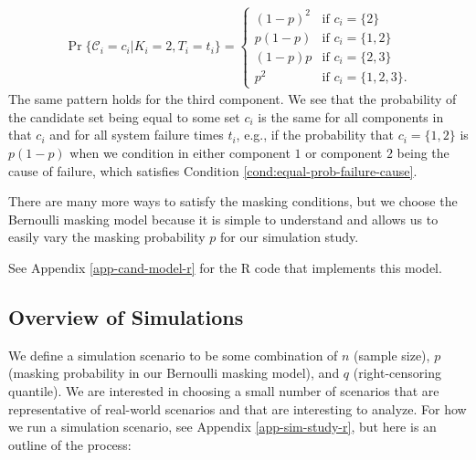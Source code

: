 \documentclass[
]{article}
\theoremstyle{definition}
\theoremstyle{plain}
\theoremstyle{definition}
\theoremstyle{definition}
\theoremstyle{definition}
\theoremstyle{definition}
\theoremstyle{remark}
\begin{document}
\begin{itemize}
\begin{align}
  \Pr\{\mathcal{C}_i = c_i | K_i = 2, T_i = t_i\} =
  \begin{cases}
     (1-p)^2  & \text{if } c_i = \{2\}\\
     p(1-p)   & \text{if } c_i = \{1,2\}\\
     (1-p)p   & \text{if } c_i = \{2,3\}\\
     p^2      & \text{if } c_i = \{1,2,3\}.
  \end{cases}
  \end{align}
  The same pattern holds for the third component. We see that the probability
  of the candidate set being equal to some set \(c_i\) is the same for all
  components in that \(c_i\) and for all system failure times \(t_i\), e.g., if
  the probability that \(c_i = \{1,2\}\) is \(p(1-p)\) when we condition in either
  component \(1\) or component \(2\) being the cause of failure, which satisfies
  Condition \ref{cond:equal-prob-failure-cause}.

  There are many more ways to satisfy the masking conditions, but we choose
  the Bernoulli masking model because it is simple to understand and
  allows us to easily vary the masking probability \(p\) for our simulation
  study.
\end{itemize}

See Appendix \ref{app-cand-model-r} for the R code that implements this model.

\hypertarget{overview-of-simulations}{%
\subsection{Overview of Simulations}\label{overview-of-simulations}}

We define a simulation scenario to be some combination of \(n\) (sample size),
\(p\) (masking probability in our Bernoulli masking model), and \(q\)
(right-censoring quantile). We are interested in choosing a small number of
scenarios that are representative of real-world scenarios and that are
interesting to analyze. For how we run a simulation scenario, see Appendix
\ref{app-sim-study-r}, but here is an outline of the process:
\end{document}
